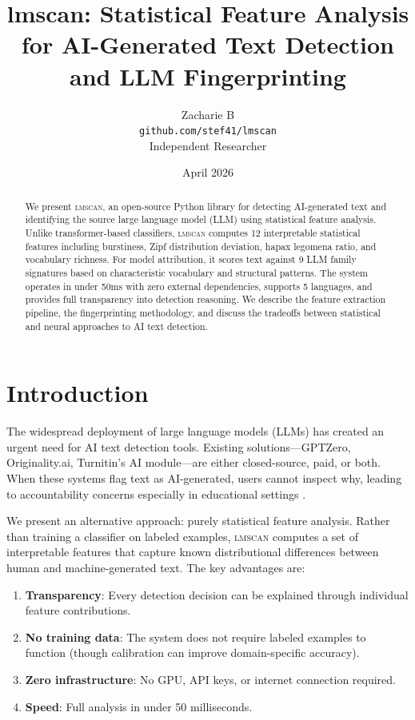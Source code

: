 \documentclass[11pt]{article}
\title{lmscan: Statistical Feature Analysis for AI-Generated Text Detection and LLM Fingerprinting}
\author{Zacharie B \\
  \texttt{github.com/stef41/lmscan} \\
  Independent Researcher}
\date{April 2026}
\begin{document}
\maketitle

\begin{abstract}
We present \textsc{lmscan}, an open-source Python library for detecting AI-generated text and identifying the source large language model (LLM) using statistical feature analysis. Unlike transformer-based classifiers, \textsc{lmscan} computes 12 interpretable statistical features including burstiness, Zipf distribution deviation, hapax legomena ratio, and vocabulary richness. For model attribution, it scores text against 9 LLM family signatures based on characteristic vocabulary and structural patterns. The system operates in under 50ms with zero external dependencies, supports 5 languages, and provides full transparency into detection reasoning. We describe the feature extraction pipeline, the fingerprinting methodology, and discuss the tradeoffs between statistical and neural approaches to AI text detection.
\end{abstract}

\section{Introduction}

The widespread deployment of large language models (LLMs) has created an urgent need for AI text detection tools. Existing solutions---GPTZero, Originality.ai, Turnitin's AI module---are either closed-source, paid, or both. When these systems flag text as AI-generated, users cannot inspect why, leading to accountability concerns especially in educational settings \cite{liang2023gpt}.

We present an alternative approach: purely statistical feature analysis. Rather than training a classifier on labeled examples, \textsc{lmscan} computes a set of interpretable features that capture known distributional differences between human and machine-generated text. The key advantages are:

\begin{enumerate}
    \item \textbf{Transparency}: Every detection decision can be explained through individual feature contributions.
    \item \textbf{No training data}: The system does not require labeled examples to function (though calibration can improve domain-specific accuracy).
    \item \textbf{Zero infrastructure}: No GPU, API keys, or internet connection required.
    \item \textbf{Speed}: Full analysis in under 50 milliseconds.
\end{enumerate}
\end{document}
